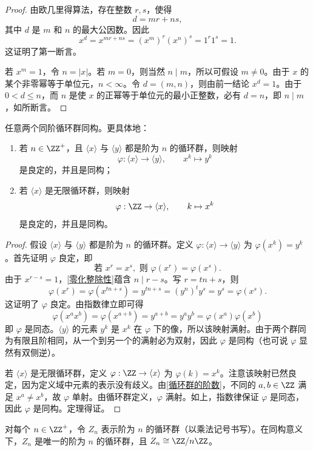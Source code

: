 \begin{proof}
	由欧几里得算法，存在整数 $r,s$，使得
	\[
	d=mr+ns,
	\]
	其中 $d$ 是 $m$ 和 $n$ 的最大公因数。因此
	\[
	x^d=x^{mr+ns}=(x^m)^r(x^n)^s=1^r1^s=1.
	\]
	这证明了第一断言。
	
	若 $x^m=1$，令 $n=|x|$。若 $m=0$，则当然 $n\mid m$，所以可假设 $m\neq0$。由于 $x$ 的某个非零幂等于单位元，$n<\infty$。令 $d=(m,n)$，则由前一结论 $x^d=1$。由于 $0<d\leq n$，而 $n$ 是使 $x$ 的正幂等于单位元的最小正整数，必有 $d=n$，即 $n\mid m$，如所断言。
\end{proof}


\begin{theorem}
	任意两个同阶循环群同构。更具体地：
	\begin{enumerate}[label=(\arabic*)]
		\item 若 $n\in\ZZ^+$，且 $\langle x\rangle$ 与 $\langle y\rangle$ 都是阶为 $n$ 的循环群，则映射
		\[
		\varphi:\langle x\rangle\to \langle y\rangle,
		\qquad x^k\mapsto y^k
		\]
		是良定的，并且是同构；
		\item 若 $\langle x\rangle$ 是无限循环群，则映射
		\[
		\varphi:\ZZ\to\langle x\rangle,
		\qquad k\mapsto x^k
		\]
		是良定的，并且是同构。
	\end{enumerate}
\end{theorem}
\begin{proof}
	假设 $\langle x\rangle$ 与 $\langle y\rangle$ 都是阶为 $n$ 的循环群。定义 $\varphi:\langle x\rangle\to\langle y\rangle$ 为 $\varphi(x^k)=y^k$。首先证明 $\varphi$ 良定，即
	\[
	\text{若 }x^r=x^s,\text{ 则 }\varphi(x^r)=\varphi(x^s).
	\]
	由于 $x^{r-s}=1$，\ref{零化整除性}蕴含 $n\mid r-s$。写 $r=tn+s$，则
	\[
	\varphi(x^r)=\varphi(x^{tn+s})=y^{tn+s}=(y^n)^t y^s=y^s=\varphi(x^s).
	\]
	这证明了 $\varphi$ 良定。由指数律立即可得 $$\varphi(x^a x^b)=\varphi(x^{a+b})=y^{a+b}= y^a y^b =\varphi(x^a)\varphi(x^b)$$即 $\varphi$ 是同态。$\langle y\rangle$ 的元素 $y^k$ 是 $x^k$ 在 $\varphi$ 下的像，所以该映射满射。由于两个群同为有限且阶相同，从一个到另一个的满射必为双射，因此 $\varphi$ 是同构（也可说 $\varphi$ 显然有双侧逆）。
	
	若 $\langle x\rangle$ 是无限循环群，定义 $\varphi:\ZZ\to\langle x\rangle$ 为 $\varphi(k)=x^k$。注意该映射已然良定，因为定义域中元素的表示没有歧义。由\ref{循环群的阶数}，不同的 $a,b\in\ZZ$ 满足 $x^a\neq x^b$，故 $\varphi$ 单射。由循环群定义，$\varphi$ 满射。如上，指数律保证 $\varphi$ 是同态，因此 $\varphi$ 是同构。定理得证。
\end{proof}

 对每个 $n\in\ZZ^+$，令 $Z_n$ 表示阶为 $n$ 的循环群（以乘法记号书写）。在同构意义下，$Z_n$ 是唯一的阶为 $n$ 的循环群，且 $Z_n\cong \ZZ/n\ZZ$。

